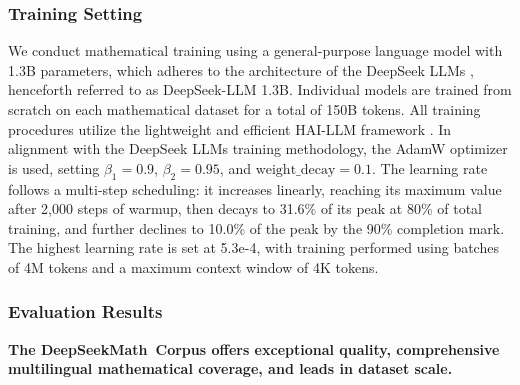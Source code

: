 \begin{itemize}[topsep=0pt]
\subsubsection{Training Setting}
\label{sec:quality-policy}
We conduct mathematical training using a general-purpose language model with 1.3B parameters, which adheres to the architecture of the DeepSeek LLMs \citep{deepseek-llm}, henceforth referred to as DeepSeek-LLM 1.3B. Individual models are trained from scratch on each mathematical dataset for a total of 150B tokens. All training procedures utilize the lightweight and efficient HAI-LLM framework \citep{haillm}. In alignment with the DeepSeek LLMs training methodology, the AdamW optimizer \citep{adamW} is used, setting $\beta_1=0.9$, $\beta_2=0.95$, and $\mathrm{weight\_decay}=0.1$. The learning rate follows a multi-step scheduling: it increases linearly, reaching its maximum value after 2,000 steps of warmup, then decays to 31.6\% of its peak at 80\% of total training, and further declines to 10.0\% of the peak by the 90\% completion mark. The highest learning rate is set at 5.3e-4, with training performed using batches of 4M tokens and a maximum context window of 4K tokens.

\subsubsection{Evaluation Results}

\textbf{The DeepSeekMath~Corpus offers exceptional quality, comprehensive multilingual mathematical coverage, and leads in dataset scale.}


\end{itemize}
